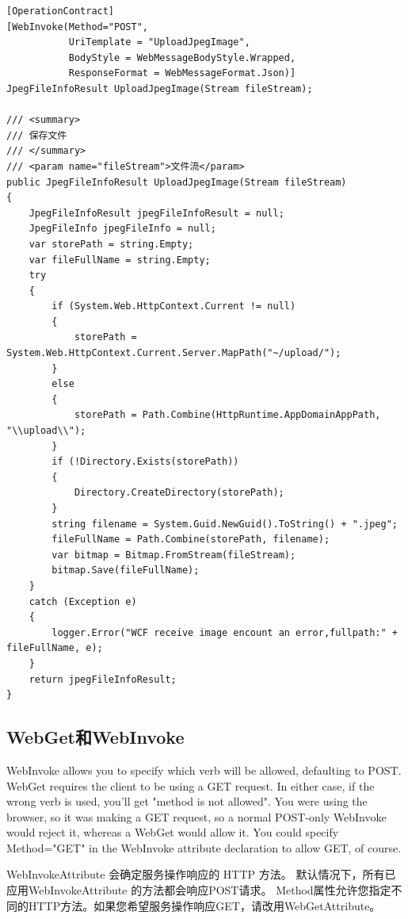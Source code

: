 \documentclass{book}
\begin{document}
\begin{lstlisting}[language={[Sharp]C}]
[OperationContract]
[WebInvoke(Method="POST",
           UriTemplate = "UploadJpegImage",
           BodyStyle = WebMessageBodyStyle.Wrapped,
           ResponseFormat = WebMessageFormat.Json)]
JpegFileInfoResult UploadJpegImage(Stream fileStream);

/// <summary>
/// 保存文件
/// </summary>
/// <param name="fileStream">文件流</param>
public JpegFileInfoResult UploadJpegImage(Stream fileStream)
{
    JpegFileInfoResult jpegFileInfoResult = null;
    JpegFileInfo jpegFileInfo = null;
    var storePath = string.Empty;
    var fileFullName = string.Empty;
    try
    {
        if (System.Web.HttpContext.Current != null)
        {
            storePath = System.Web.HttpContext.Current.Server.MapPath("~/upload/");
        }
        else
        {
            storePath = Path.Combine(HttpRuntime.AppDomainAppPath, "\\upload\\");
        }
        if (!Directory.Exists(storePath))
        {
            Directory.CreateDirectory(storePath);
        }
        string filename = System.Guid.NewGuid().ToString() + ".jpeg";
        fileFullName = Path.Combine(storePath, filename);
        var bitmap = Bitmap.FromStream(fileStream);
        bitmap.Save(fileFullName);        
    }
    catch (Exception e)
    {
        logger.Error("WCF receive image encount an error,fullpath:" + fileFullName, e);        
    }
    return jpegFileInfoResult;
}
\end{lstlisting}


\subsection{WebGet和WebInvoke}

WebInvoke allows you to specify which verb will be allowed, 
defaulting to POST. WebGet requires the client to be using a GET request.
 In either case, if the wrong verb is used, you'll get "method is not allowed". 
 You were using the browser, so it was making a GET request, 
 so a normal POST-only WebInvoke would reject it, whereas a WebGet would allow it. 
 You could specify Method="GET" in the WebInvoke attribute declaration to allow GET, of course.

 WebInvokeAttribute 会确定服务操作响应的 HTTP 方法。
 默认情况下，所有已应用WebInvokeAttribute 的方法都会响应POST请求。
 Method属性允许您指定不同的HTTP方法。如果您希望服务操作响应GET，请改用WebGetAttribute。
\end{document}
